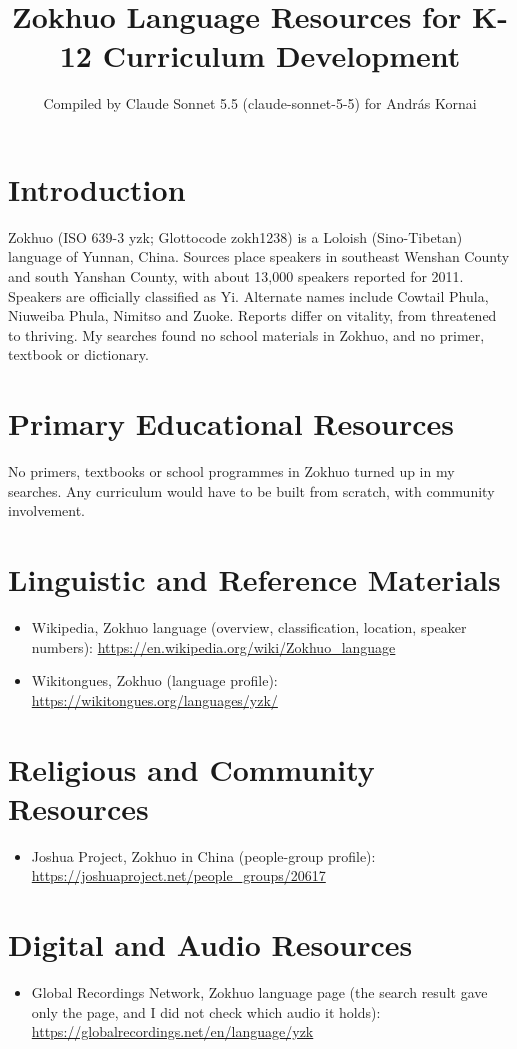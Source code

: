 \documentclass[12pt]{article}
\title{Zokhuo Language Resources for K-12 Curriculum Development}
\author{Compiled by Claude Sonnet 5.5 (claude-sonnet-5-5) for Andr\'as Kornai}
\date{}
\begin{document}
\maketitle

\section{Introduction}
Zokhuo (ISO 639-3 yzk; Glottocode zokh1238) is a Loloish (Sino-Tibetan) language of Yunnan, China. Sources place speakers in southeast Wenshan County and south Yanshan County, with about 13,000 speakers reported for 2011. Speakers are officially classified as Yi. Alternate names include Cowtail Phula, Niuweiba Phula, Nimitso and Zuoke. Reports differ on vitality, from threatened to thriving. My searches found no school materials in Zokhuo, and no primer, textbook or dictionary.

\section{Primary Educational Resources}
No primers, textbooks or school programmes in Zokhuo turned up in my searches. Any curriculum would have to be built from scratch, with community involvement.

\section{Linguistic and Reference Materials}
\begin{itemize}
\item Wikipedia, Zokhuo language (overview, classification, location, speaker numbers): \url{https://en.wikipedia.org/wiki/Zokhuo_language}
\item Wikitongues, Zokhuo (language profile): \url{https://wikitongues.org/languages/yzk/}
\end{itemize}

\section{Religious and Community Resources}
\begin{itemize}
\item Joshua Project, Zokhuo in China (people-group profile): \url{https://joshuaproject.net/people_groups/20617}
\end{itemize}

\section{Digital and Audio Resources}
\begin{itemize}
\item Global Recordings Network, Zokhuo language page (the search result gave only the page, and I did not check which audio it holds): \url{https://globalrecordings.net/en/language/yzk}
\end{itemize}
\end{document}
